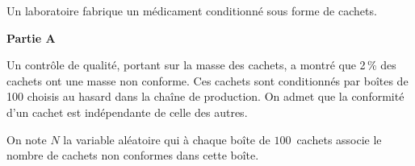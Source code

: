 \smallskip

Un laboratoire fabrique un médicament conditionné sous forme de cachets.

\begin{center}
\textbf{Partie A}
\end{center}

Un contrôle de qualité, portant sur la masse des cachets, a montré que 2\,\% des cachets ont une masse non conforme. Ces cachets sont conditionnés par boîtes de 100 choisis au hasard dans la chaîne de production. On admet que la conformité d'un cachet est indépendante de celle des autres.



On note $N$ la variable aléatoire qui à chaque boîte de $100$~cachets associe le nombre de cachets non conformes dans cette boîte.

